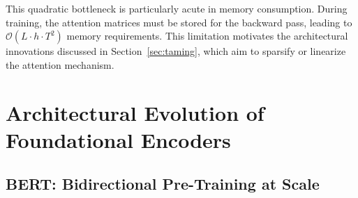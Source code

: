 \documentclass[11pt]{article}
\begin{document}
This quadratic bottleneck is particularly acute in memory consumption. During training, the attention matrices must be stored for the backward pass, leading to $\mathcal{O}(L \cdot h \cdot T^2)$ memory requirements. This limitation motivates the architectural innovations discussed in Section~\ref{sec:taming}, which aim to sparsify or linearize the attention mechanism.

\section{Architectural Evolution of Foundational Encoders}

\subsection{BERT: Bidirectional Pre-Training at Scale}
\end{document}

